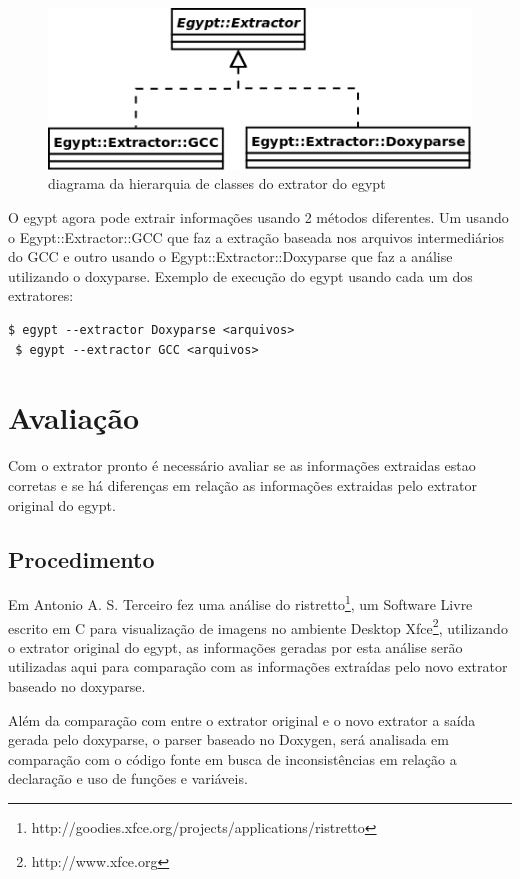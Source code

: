 \begin{figure}[h]
\center
\includegraphics[scale=0.5]{imagens/egypt-diagram-extractor}
\caption{diagrama da hierarquia de classes do extrator do egypt}
\label{egypt-diagram-extractor}
\end{figure}

O egypt agora pode extrair informações usando 2 métodos diferentes. Um usando o
Egypt::Extractor::GCC que faz a extração baseada nos arquivos intermediários do
GCC e outro usando o Egypt::Extractor::Doxyparse que faz a análise utilizando o
doxyparse. Exemplo de execução do egypt usando cada um dos extratores:

\begin{Verbatim}[frame=single,fontsize=\relsize{-2},fontfamily=courier]
 $ egypt --extractor Doxyparse <arquivos>
 $ egypt --extractor GCC <arquivos>
\end{Verbatim}

\chapter{Avaliação}

Com o extrator pronto é necessário avaliar se as informações extraidas estao corretas
e se há diferenças em relação as informações extraidas pelo extrator original do egypt.

\section{Procedimento}

Em \cite{StructuralComplexityEvolution} Antonio A. S. Terceiro fez uma análise
do ristretto\footnote{http://goodies.xfce.org/projects/applications/ristretto},
um Software Livre escrito em C para visualização de imagens no ambiente Desktop
Xfce\footnote{http://www.xfce.org}, utilizando o extrator original do egypt, as
informações geradas por esta análise serão utilizadas aqui para comparação com
as informações extraídas pelo novo extrator baseado no doxyparse.

Além da comparação com entre o extrator original e o novo extrator a saída
gerada pelo doxyparse, o parser baseado no Doxygen, será analisada em
comparação com o código fonte em busca de inconsistências em relação a
declaração e uso de funções e variáveis.

